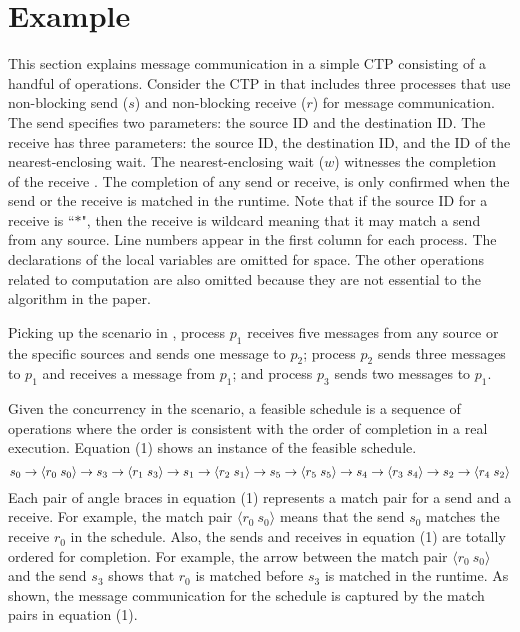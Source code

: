 \section{Example}

\examplefigone

This section explains message communication in a simple CTP consisting of a handful of operations. Consider the CTP in  that includes three processes that use non-blocking send ($s$) and non-blocking receive ($r$) for message communication. The send specifies two parameters: the source ID and the destination ID. The receive has three parameters: the source ID, the destination ID, and the ID of the nearest-enclosing wait. The nearest-enclosing wait ($w$) witnesses the completion of the receive \cite{DBLP:conf/kbse/HuangMM13}. The completion of any send or receive, is only confirmed when the send or the receive is matched in the runtime. Note that if the source ID for a receive is ``$\ast$", then the receive is wildcard meaning that it may match a send from any source. 
Line numbers appear in the first column for each process. The declarations of the local variables are omitted for space. The other operations related to computation are also omitted because they are not essential to the algorithm in the paper.

Picking up the scenario in , process $p_1$ receives five messages from any source or the specific sources and sends one message to $p_2$; process $p_2$ sends three messages to $p_1$ and receives a message from $p_1$; and process $p_3$ sends two messages to $p_1$. 




Given the concurrency in the scenario, a feasible schedule is a sequence of operations where the order is consistent with the order of completion in a real execution. Equation (1) shows an instance of the feasible schedule. 
\begin{equation}
\scriptsize
s_0\rightarrow \langle r_0\ s_0\rangle \rightarrow s_3\rightarrow \langle r_1\ s_3\rangle \rightarrow s_1\rightarrow \langle r_2\ s_1\rangle \rightarrow 
s_5\rightarrow \langle r_5\ s_5\rangle \rightarrow s_4\rightarrow \langle r_3\ s_4\rangle \rightarrow s_2\rightarrow \langle r_4\ s_2\rangle
\end{equation} 
Each pair of angle braces in equation (1) represents a match pair for a send and a receive. For example, the match pair $\langle r_0\ s_0\rangle$ means that the send $s_0$ matches the receive $r_0$ in the schedule. Also, the sends and receives in equation (1) are totally ordered for completion. For example,
the arrow between the match pair $\langle r_0\ s_0\rangle$ and the send $s_3$ shows that $r_0$ is matched before $s_3$ is matched in the runtime. 
As shown, the message communication for the schedule is captured by the match pairs in equation (1).

